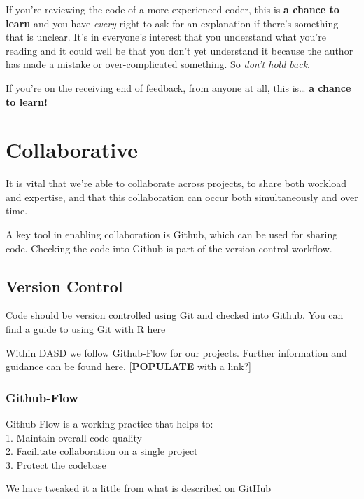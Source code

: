 \documentclass[]{book}
\begin{document}
If you're reviewing the code of a more experienced coder, this is \textbf{a chance to learn} and you have \emph{every} right to ask for an explanation if there's something that is unclear. It's in everyone's interest that you understand what you're reading and it could well be that you don't yet understand it because the author has made a mistake or over-complicated something. So \emph{don't hold back}.

If you're on the receiving end of feedback, from anyone at all, this is\ldots{} \textbf{a chance to learn!}

\hypertarget{collaborate}{%
\chapter{Collaborative}\label{collaborate}}

It is vital that we're able to collaborate across projects, to share both workload and expertise, and that this collaboration can occur both simultaneously and over time.

A key tool in enabling collaboration is Github, which can be used for sharing code. Checking the code into Github is part of the version control workflow.

\hypertarget{versioncontrol}{%
\section{Version Control}\label{versioncontrol}}

Code should be version controlled using Git and checked into Github.
You can find a guide to using Git with R \href{http://happygitwithr.com/}{here}

Within DASD we follow Github-Flow for our projects. Further information and guidance can be found here. {[}\textbf{POPULATE} with a link?{]}

\hypertarget{flow}{%
\subsection*{Github-Flow}\label{flow}}

Github-Flow is a working practice that helps to:\\
1. Maintain overall code quality\\
2. Facilitate collaboration on a single project\\
3. Protect the codebase

We have tweaked it a little from what is \href{https://guides.github.com/introduction/flow/}{described on GitHub}
\end{document}
